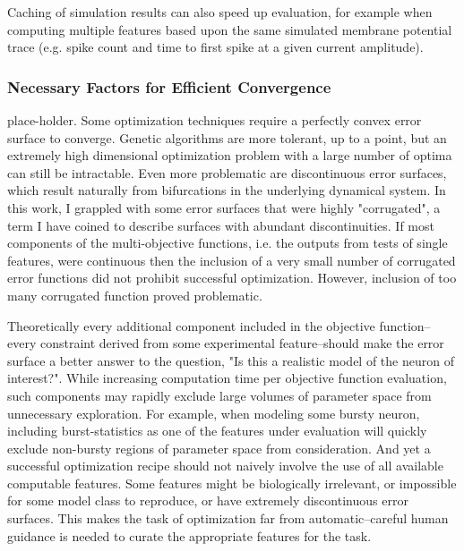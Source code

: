 Caching of simulation results can also speed up evaluation, for example when computing multiple features based upon the same simulated membrane potential trace (e.g. spike count and time to first spike at a given current amplitude).

\subsubsection{Necessary Factors for Efficient Convergence}
place-holder.
Some optimization techniques require a perfectly convex error surface to converge.
Genetic algorithms are more tolerant, up to a point, but an extremely high dimensional optimization problem with a large number of optima can still be intractable.
Even more problematic are discontinuous error surfaces, which result naturally from bifurcations in the underlying dynamical system.
In this work, I grappled with some error surfaces that were highly "corrugated", a term I have coined to describe surfaces with abundant discontinuities.
If most components of the multi-objective functions, i.e. the outputs from tests of single features, were continuous then the inclusion of a very small number of corrugated error functions did not prohibit successful optimization.
However, inclusion of too many corrugated function proved problematic.

Theoretically every additional component included in the objective function--every constraint derived from some experimental feature--should make the error surface a better answer to the question, "Is this a realistic model of the neuron of interest?".
While increasing computation time per objective function evaluation, such components may rapidly exclude large volumes of parameter space from unnecessary exploration.
For example, when modeling some bursty neuron, including burst-statistics as one of the features under evaluation will quickly exclude non-bursty regions of parameter space from consideration.
And yet a successful optimization recipe should not naively involve the use of all available computable features.
Some features might be biologically irrelevant, or impossible for some model class to reproduce, or have extremely discontinuous error surfaces.
This makes the task of optimization far from automatic--careful human guidance is needed to curate the appropriate features for the task. 


